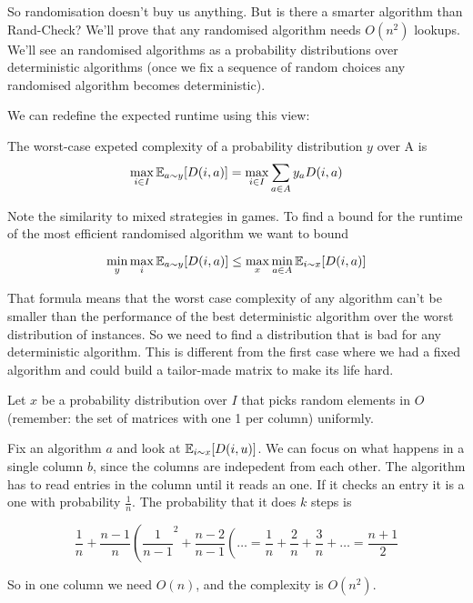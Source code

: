 So randomisation doesn't buy us anything. But is there a smarter algorithm than {\sc Rand-Check}? We'll prove that any randomised algorithm needs $O(n^2)$ lookups. We'll see an randomised algorithms as a probability distributions over deterministic algorithms (once we fix a sequence of random choices any randomised algorithm becomes deterministic).

We can redefine the expected runtime using this view:

\begin{Def} The worst-case expeted complexity of a probability distribution $y$ over A is
\[\max_{i\in I} \mathbb{E}_{a\sim y}[D(i,a)] = \max_{i\in I} \sum_{a\in A} y_a D(i,a)\]
\end{Def}

Note the similarity to mixed strategies in games. To find a bound for the runtime of the most efficient randomised algorithm we want to bound 

\[\min_y \max_i \mathbb{E}_{a\sim y}[D(i,a)] \leq \max_x\min_{a\in A} \mathbb{E}_{i\sim x}[D(i,a)]\]

That formula means that the worst case complexity of any algorithm can't be smaller than the performance of the best deterministic algorithm over the worst distribution of instances. So we need to find a distribution that is bad for any deterministic algorithm. This is different from the first case where we had a fixed algorithm and could build a tailor-made matrix to make its life hard.

Let $x$ be a probability distribution over $I$ that picks random elements in $O$ (remember: the set of matrices with one 1 per column) uniformly.

Fix an algorithm $a$ and look at $\mathbb{E}_{i\sim x}[D(i,u)]$. We can focus on what happens in a single column $b$, since the columns are indepedent from each other. The algorithm has to read entries in the column until it reads an one. If it checks an entry it is a one with probability $\frac{1}{n}$. The probability that it does $k$ steps is

\[\frac{1}{n} + \frac{n-1}{n}\left( \frac{1}{n-1}^2+\frac{n-2}{n-1}\left(\ldots = \frac{1}{n} + \frac 2n + \frac 3n + \right.\right.\ldots= \frac{n+1}{2}\]

So in one column we need $O(n)$, and the complexity is $O(n^2)$.

